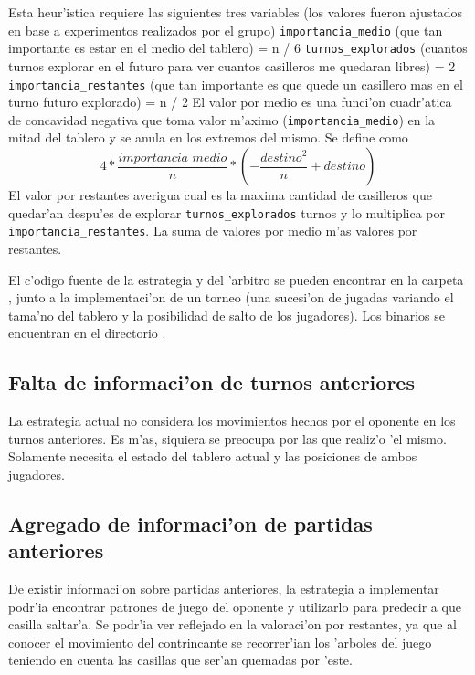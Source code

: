 \begin{algorithmic}[1]
\STATE Esta heur'istica requiere las siguientes tres variables (los valores fueron ajustados en base a experimentos realizados por el grupo)
	\STATE \verb|importancia_medio| (que tan importante es estar en el medio del tablero) = n / 6
	\STATE \verb|turnos_explorados| (cuantos turnos explorar en el futuro para ver cuantos casilleros me quedaran libres) = 2
	\STATE \verb|importancia_restantes| (que tan importante es que quede un casillero mas en el turno futuro explorado) = n / 2
\STATE El valor por medio es una funci'on cuadr'atica de concavidad negativa que toma valor m'aximo (\verb|importancia_medio|) en la mitad del tablero y se anula en los extremos del mismo. Se define como
	$$4 * \frac{importancia\_medio}{n} * \left(-\frac{destino^2}{n} + destino\right)$$
\STATE El valor por restantes averigua cual es la maxima cantidad de casilleros que quedar'an despu'es de explorar \verb|turnos_explorados| turnos y lo multiplica por \verb|importancia_restantes|.
\RETURN La suma de valores por medio m'as valores por restantes.
\end{algorithmic}

\vspace{1em}

El c'odigo fuente de la estrategia y  del 'arbitro se pueden encontrar en la carpeta , junto a la implementaci'on de un torneo (una sucesi'on de jugadas variando el tama'no del tablero y la posibilidad de salto de los jugadores). Los binarios se encuentran en el directorio .



\subsection{Falta de informaci'on de turnos anteriores}
La estrategia actual no considera los movimientos hechos por el oponente en los turnos anteriores. Es m'as, siquiera se preocupa por las que realiz'o 'el mismo. Solamente necesita el estado del tablero actual y las posiciones de ambos jugadores.


\subsection{Agregado de informaci'on de partidas anteriores}
De existir informaci'on sobre partidas anteriores, la estrategia a implementar podr'ia encontrar patrones de juego del oponente y utilizarlo para predecir a que casilla saltar'a. Se podr'ia ver reflejado en la valoraci'on por restantes, ya que al conocer el movimiento del contrincante se recorrer'ian los 'arboles del juego teniendo en cuenta las casillas que ser'an quemadas por 'este.


